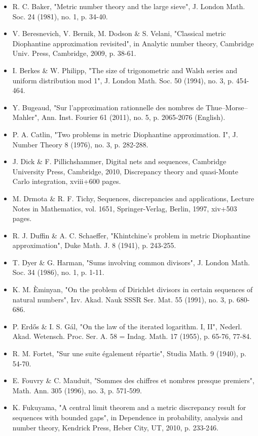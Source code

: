 \documentclass[10pt]{article}
\newcommand{\1}{\mathbf{1}}
\begin{document}
\begin{itemize}
  \item[] [6] R. C. Baker, "Metric number theory and the large sieve", J. London Math. Soc. 24 (1981), no. 1, p. 34-40.
  \item[] [7] V. Beresnevich, V. Bernik, M. Dodson \& S. Velani, "Classical metric Diophantine approximation revisited", in Analytic number theory, Cambridge Univ. Press, Cambridge, 2009, p. 38-61.
  \item[] [8] I. Berkes \& W. Philipp, "The size of trigonometric and Walsh series and uniform distribution mod 1", J. London Math. Soc. 50 (1994), no. 3, p. 454-464.
  \item[] [9] Y. Bugeaud, "Sur l'approximation rationnelle des nombres de Thue--Morse--Mahler", Ann. Inst. Fourier 61 (2011), no. 5, p. 2065-2076 (English).
  \item[] [10] P. A. Catlin, "Two problems in metric Diophantine approximation. I", J. Number Theory 8 (1976), no. 3, p. 282-288.
  \item[] [11] J. Dick \& F. Pillichshammer, Digital nets and sequences, Cambridge University Press, Cambridge, 2010, Discrepancy theory and quasi-Monte Carlo integration, xviii+600 pages.
  \item[] [12] M. Drmota \& R. F. Tichy, Sequences, discrepancies and applications, Lecture Notes in Mathematics, vol. 1651, Springer-Verlag, Berlin, 1997, xiv+503 pages.
  \item[] [13] R. J. Duffin \& A. C. Schaeffer, "Khintchine's problem in metric Diophantine approximation", Duke Math. J. 8 (1941), p. 243-255.
  \item[] [14] T. Dyer \& G. Harman, "Sums involving common divisors", J. London Math. Soc. 34 (1986), no. 1, p. 1-11.
  \item[] [15] K. M. Èminyan, "On the problem of Dirichlet divisors in certain sequences of natural numbers", Izv. Akad. Nauk SSSR Ser. Mat. 55 (1991), no. 3, p. 680-686.
  \item[] [16] P. Erdős \& I. S. Gál, "On the law of the iterated logarithm. I, II", Nederl. Akad. Wetensch. Proc. Ser. A. 58 = Indag. Math. 17 (1955), p. 65-76, 77-84.
  \item[] [17] R. M. Fortet, "Sur une suite également répartie", Studia Math. 9 (1940), p. 54-70.
  \item[] [18] E. Fouvry \& C. Mauduit, "Sommes des chiffres et nombres presque premiers", Math. Ann. 305 (1996), no. 3, p. 571-599.
  \item[] [19] K. Fukuyama, "A central limit theorem and a metric discrepancy result for sequences with bounded gaps", in Dependence in probability, analysis and number theory, Kendrick Press, Heber City, UT, 2010, p. 233-246.

\end{itemize}
\end{document}
